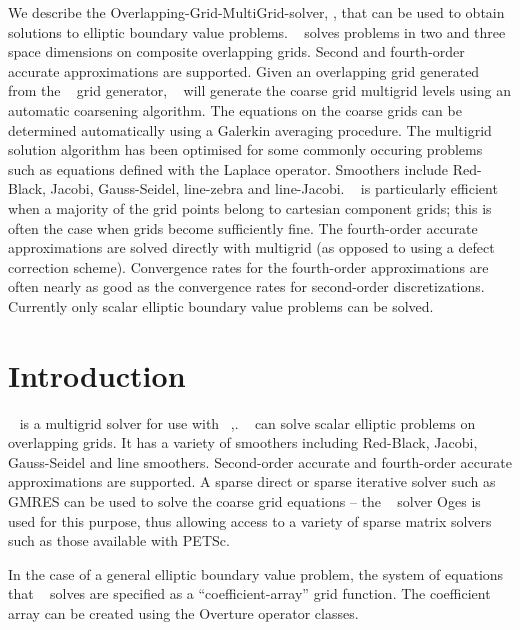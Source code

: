 \documentclass[11pt]{article}
\begin{document}
\begin{flushleft}
We describe the Overlapping-Grid-MultiGrid-solver, \Ogmg, that can be used to obtain solutions 
to elliptic boundary value problems.
\Ogmg~ solves problems in two and three space
dimensions on composite overlapping grids. 
Second and fourth-order accurate approximations are supported.
Given an overlapping grid generated from the \Ogen~  grid generator,
\Ogmg~  will generate the coarse grid multigrid levels using an automatic coarsening algorithm.
The equations on the coarse grids can be determined automatically using a Galerkin averaging
procedure.
The multigrid solution algorithm has been optimised for some commonly occuring problems such as
equations defined with the Laplace operator.
Smoothers include Red-Black, Jacobi, Gauss-Seidel, line-zebra and line-Jacobi.
\Ogmg~  is particularly efficient when a majority of the grid points belong to cartesian component grids;
this is often the case when grids become sufficiently fine.
The fourth-order accurate approximations are solved directly with multigrid (as opposed to using
a defect correction scheme). Convergence rates for the fourth-order approximations are often nearly as
good as the convergence rates for second-order discretizations.
Currently only scalar elliptic boundary value problems can be solved. 
\end{flushleft}

\vfill\eject
\tableofcontents



\vfill\eject
\section{Introduction}

\Ogmg~ is a multigrid solver for use with \Overture~\cite{overset96},\cite{OGES}.
\Ogmg~ can solve scalar elliptic problems
on overlapping grids. It has a variety of smoothers including
Red-Black, Jacobi, Gauss-Seidel and line smoothers. Second-order accurate and fourth-order
accurate approximations are supported.
A sparse direct or sparse iterative
solver such as GMRES can be used to solve the coarse grid equations --
the \Overture~ solver Oges is used for this purpose, thus allowing access to a variety of
sparse matrix solvers such as those available with PETSc\cite{PETSc}.

In the case of a general elliptic boundary value problem, 
the system of equations that \Ogmg~ solves are specified as a ``coefficient-array''
grid function. The coefficient array can be created using the Overture operator classes. 
\end{document}
